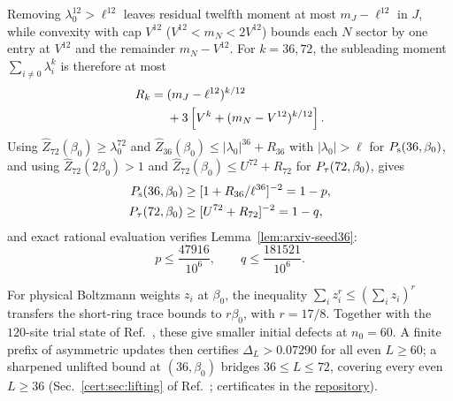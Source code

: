 Removing $\lambda_0^{12}>\ell^{12}$ leaves residual twelfth moment at
most $m_J-\ell^{12}$ in $J$, while convexity with cap $V^{12}$
($V^{12}<m_N<2V^{12}$) bounds each $N$ sector by one entry at $V^{12}$
and the remainder $m_N-V^{12}$. For $k=36,72$, the subleading moment
$\sum_{i\ne0}\lambda_i^k$ is therefore at most
\begin{align}
 R_k={}&(m_J-\ell^{12})^{k/12}\notag\\
 &+3\left[V^k+(m_N-V^{12})^{k/12}\right].
 \label{seed:residual}
\end{align}
Using $\widehat Z_{72}(\beta_0)\ge\lambda_0^{72}$ and
$\widehat Z_{36}(\beta_0)\le|\lambda_0|^{36}+R_{36}$ with
$|\lambda_0|>\ell$ for $P_{\mathrm s}(36,\beta_0)$, and using
$\widehat Z_{72}(2\beta_0)>1$ and
$\widehat Z_{72}(\beta_0)\le U^{72}+R_{72}$ for $P_{\tau}(72,\beta_0)$, gives
\begin{align}
 P_{\mathrm s}(36,\beta_0)&\ge[1+R_{36}/\ell^{36}]^{-2}=1-p,\notag\\
 P_{\tau}(72,\beta_0)&\ge[U^{72}+R_{72}]^{-2}=1-q,
 \label{seed:long}
\end{align}
and exact rational evaluation verifies Lemma~\ref{lem:arxiv-seed36}:
\begin{equation}
 p\le\frac{47916}{10^6},\qquad q\le\frac{181521}{10^6}.
 \label{seed:bounds}
\end{equation}

For physical Boltzmann weights $z_i$ at $\beta_0$, the inequality
$\sum_i z_i^r\le(\sum_i z_i)^r$ transfers the short-ring trace
bounds to $r\beta_0$, with $r=17/8$. Together with the $120$-site
trial state of Ref.~\cite{OpenAI2026Periodic}, these give smaller
initial defects at $n_0=60$. A finite prefix of asymmetric updates
then certifies $\Delta_L>0.07290$ for all even $L\ge60$; a
sharpened unlifted bound at $(36,\beta_0)$ bridges $36\le L\le72$,
covering every even $L\ge36$ (Sec.~\ref{cert:sec:lifting} of
Ref.~\cite{SM}; certificates in the
\href{https://github.com/LionSR/CertifiedGaps}{repository}).


